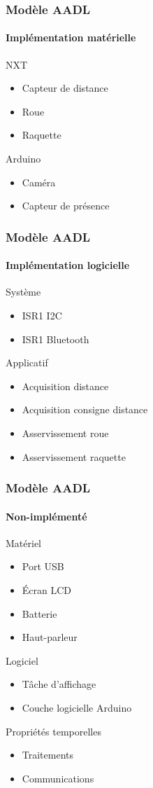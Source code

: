 \documentclass{beamer}
\title{}
\author{Armel}
\institute{}
\date{Mai 2014}
\begin{document}
  \begin{frame}
    \frametitle{Modèle AADL}
    \framesubtitle{Implémentation matérielle}

    NXT
    \begin{itemize}
      \item Capteur de distance
      \item Roue
      \item Raquette
    \end{itemize} \vspace{1em}

    Arduino
    \begin{itemize}
      \item Caméra
      \item Capteur de présence
    \end{itemize}
  \end{frame}

  \begin{frame}
    \frametitle{Modèle AADL}
    \framesubtitle{Implémentation logicielle}

    Système
    \begin{itemize}
      \item ISR1 I2C
      \item ISR1 Bluetooth
    \end{itemize} \vspace{1em}

    Applicatif
    \begin{itemize}
      \item Acquisition distance
      \item Acquisition consigne distance
      \item Asservissement roue
      \item Asservissement raquette
    \end{itemize}
  \end{frame}

  \begin{frame}
    \frametitle{Modèle AADL}
    \framesubtitle{Non-implémenté}

    Matériel
    \begin{itemize}
      \item Port USB
      \item Écran LCD
      \item Batterie
      \item Haut-parleur
    \end{itemize} \vspace{1em}

    Logiciel
    \begin{itemize}
      \item Tâche d’affichage
      \item Couche logicielle Arduino
    \end{itemize} \vspace{1em}

    Propriétés temporelles
    \begin{itemize}
      \item Traitements
      \item Communications
    \end{itemize}
  \end{frame}
\end{document}

